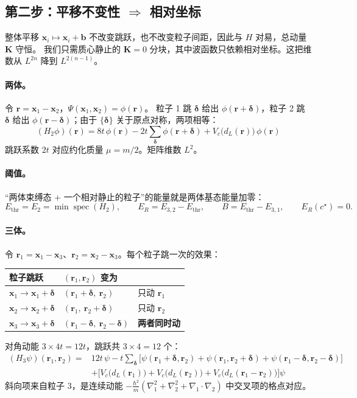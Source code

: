 \documentclass[UTF8,fontset=fandol,11pt,a4paper]{ctexart}
\newcommand{\rr}{\mathbf r}
\newcommand{\dd}{\boldsymbol\delta}
\newcommand{\Ethr}{E_{\mathrm{thr}}}
\begin{document}
\subsection{第二步：平移不变性 $\Rightarrow$ 相对坐标}
整体平移 $\mathbf x_i\mapsto\mathbf x_i+\mathbf b$ 不改变跳跃，也不改变粒子间距，因此与 $H$ 对易，总动量 $\mathbf K$ 守恒。
我们只需质心静止的 $\mathbf K=0$ 分块，其中波函数只依赖相对坐标。这把维数从 $L^{2n}$ 降到 $L^{2(n-1)}$。

\paragraph{两体。}令 $\rr=\mathbf x_1-\mathbf x_2$，$\Psi(\mathbf x_1,\mathbf x_2)=\phi(\rr)$。
粒子 1 跳 $\dd$ 给出 $\phi(\rr+\dd)$，粒子 2 跳 $\dd$ 给出 $\phi(\rr-\dd)$；由于 $\{\dd\}$ 关于原点对称，两项相等：
\begin{equation}
\boxed{(H_2\phi)(\rr)=8t\,\phi(\rr)-2t\sum_{\dd}\phi(\rr+\dd)+V_c\big(d_L(\rr)\big)\,\phi(\rr)}
\label{eq:h2}
\end{equation}
跳跃系数 $2t$ 对应约化质量 $\mu=m/2$。矩阵维数 $L^2$。

\paragraph{阈值。}“两体束缚态 + 一个相对静止的粒子”的能量就是两体基态能量加零：
\begin{equation}
\Ethr=E_2=\min\operatorname{spec}(H_2),\qquad
E_R=E_{3,2}-\Ethr,\qquad B=\Ethr-E_{3,1},\qquad E_R(c^\star)=0.
\end{equation}

\paragraph{三体。}令 $\rr_1=\mathbf x_1-\mathbf x_3$、$\rr_2=\mathbf x_2-\mathbf x_3$。每个粒子跳一次的效果：
\begin{center}
\begin{tabular}{lll}
\toprule
粒子跳跃 & $(\rr_1,\rr_2)$ 变为 & \\
\midrule
$\mathbf x_1\to\mathbf x_1+\dd$ & $(\rr_1+\dd,\ \rr_2)$ & 只动 $\rr_1$ \\
$\mathbf x_2\to\mathbf x_2+\dd$ & $(\rr_1,\ \rr_2+\dd)$ & 只动 $\rr_2$ \\
$\mathbf x_3\to\mathbf x_3+\dd$ & $(\rr_1-\dd,\ \rr_2-\dd)$ & \textbf{两者同时动} \\
\bottomrule
\end{tabular}
\end{center}
对角动能 $3\times4t=12t$，跳跃共 $3\times4=12$ 个：
\begin{equation}
\boxed{\begin{aligned}
(H_3\psi)(\rr_1,\rr_2)={}&12t\,\psi-t\sum_{\dd}\Big[\psi(\rr_1{+}\dd,\rr_2)+\psi(\rr_1,\rr_2{+}\dd)+\psi(\rr_1{-}\dd,\rr_2{-}\dd)\Big]\\
&+\Big[V_c\big(d_L(\rr_1)\big)+V_c\big(d_L(\rr_2)\big)+V_c\big(d_L(\rr_1-\rr_2)\big)\Big]\psi
\end{aligned}}
\label{eq:h3}
\end{equation}
斜向项来自粒子 3，是连续动能 $-\tfrac{\hbar^2}{m}(\nabla_1^2+\nabla_2^2+\nabla_1\!\cdot\!\nabla_2)$ 中交叉项的格点对应。
\end{document}

